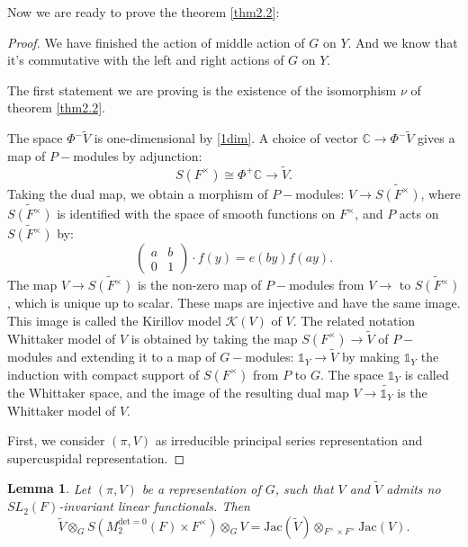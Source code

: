 \documentclass[12pt,a4paper,english]{article}
\theoremstyle{plain}
\newtheorem{lem}[thm]{Lemma}
\theoremstyle{definition}
\begin{document}
Now we are ready to prove the theorem \ref{thm2.2}:
\begin{proof} 
We have finished the action of middle action of $G$ on $Y$. And we know that it's commutative with the left and right actions of $G $ on $Y$.

The first statement we are proving is the existence of the isomorphism $\nu$ of theorem \ref{thm2.2}.

The space $\Phi^{-}\widetilde{V}$ is one-dimensional by \ref{1dim}. A choice of vector $\mathbb{C}\rightarrow \Phi^{-}\widetilde{V}$ gives a map of $P-$modules by adjunction:
\begin{equation*}
    S(F^{\times})\cong \Phi^{+}\mathbb{C}\rightarrow \widetilde{V}.
\end{equation*}
Taking  the dual map, we obtain a morphism of $P-$modules: $V\rightarrow\widetilde{S(F^{\times})}$, where $\widetilde{S(F^{\times})}$ is identified with the space of smooth functions on $F^{\times}$, and $P$ acts on $\widetilde{S(F^{\times})}$ by:
\begin{equation*}
    \begin{pmatrix}
    a&b\\
    0&1
    \end{pmatrix}\cdot f(y)=e(by)f(ay).
\end{equation*}
The map $V\rightarrow \widetilde{S(F^{\times})}$ is the non-zero map of $P-$modules from $V\rightarrow $ to $\widetilde{S(F^{\times})}$, which is unique up to scalar. These maps are injective and have the same image. This image is called the Kirillov model $\mathcal{K}(V)$ of $V$. The related notation Whittaker model of $V$ is obtained by taking the map $S(F^{\times})\rightarrow \widetilde{V}$ of $P-$modules and extending it to a map of $G-$modules: $\mathbb{1}_{Y}\rightarrow\widetilde{V}$ by making $\mathbb{1}_{Y}$ the induction with compact support of $S(F^{\times})$ from $P$ to $G$. The space $\mathbb{1}_{Y}$ is called the Whittaker space, and the image of the resulting dual map $V\rightarrow\widetilde{\mathbb{1}_{Y}}$ is the Whittaker model of $V$.




First, we consider $(\pi, V)$ as irreducible principal series representation and supercuspidal representation. 


\end{proof}

\begin{lem}
Let $(\pi, V)$ be a representation of $G$, such that $V$ and $\widetilde{V}$ admits no $SL_{2}(F)$-invariant linear functionals. Then 
\begin{equation*}
    \widetilde{V}\otimes_{G}S(M^{\text{det}=0}_{2}(F)\times F^{\times})\otimes_{G} V =\text{Jac}(\widetilde{V})\otimes_{F^{\times}\times F^{\times}} \text{Jac}(V).
\end{equation*}
\end{lem}


 





\newpage


\end{document}
